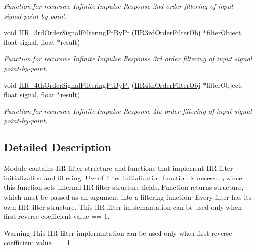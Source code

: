 \begin{DoxyCompactItemize}
\begin{DoxyCompactList}\small\item\em Function for recursive Infinite Impulse Response 2nd order filtering of input signal point-\/by-\/point. \end{DoxyCompactList}\item 
void \mbox{\hyperlink{group___i_i_rfilter_pt_by_pt_ga5c85182c2d872ceb73f5e9410b44b361_ga5c85182c2d872ceb73f5e9410b44b361}{I\+I\+R\+\_\+3rd\+Order\+Signal\+Filtering\+Pt\+By\+Pt}} (\mbox{\hyperlink{struct_i_i_r3rd_order_filter_obj}{I\+I\+R3rd\+Order\+Filter\+Obj}} $\ast$filter\+Object, float signal, float $\ast$result)
\begin{DoxyCompactList}\small\item\em Function for recursive Infinite Impulse Response 3rd order filtering of input signal point-\/by-\/point. \end{DoxyCompactList}\item 
void \mbox{\hyperlink{group___i_i_rfilter_pt_by_pt_gaa0781bdc4c0b1a47f265ffb6c2a3261b_gaa0781bdc4c0b1a47f265ffb6c2a3261b}{I\+I\+R\+\_\+4th\+Order\+Signal\+Filtering\+Pt\+By\+Pt}} (\mbox{\hyperlink{struct_i_i_r4th_order_filter_obj}{I\+I\+R4th\+Order\+Filter\+Obj}} $\ast$filter\+Object, float signal, float $\ast$result)
\begin{DoxyCompactList}\small\item\em Function for recursive Infinite Impulse Response 4th order filtering of input signal point-\/by-\/point. \end{DoxyCompactList}\end{DoxyCompactItemize}


\subsection{Detailed Description}
Module contains I\+IR filter structure and functions that implement I\+IR filter initialization and filtering. Use of filter initialization function is necessary since this function sets internal I\+IR filter structure fields. Function returns structure, which must be passed as an argument into a filtering function. Every filter has it\textquotesingle{}s own I\+IR filter structure. This I\+IR filter implemantation can be used only when first reverse coefficient value == 1. 

\begin{DoxyWarning}{Warning}
This I\+IR filter implemantation can be used only when first reverse coefficient value == 1 
\end{DoxyWarning}


